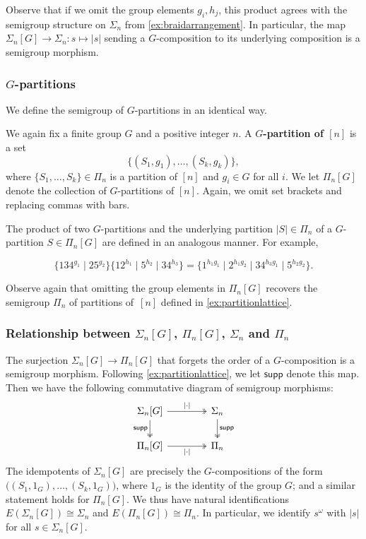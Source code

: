 \documentclass[11pt, oneside, reqno]{amsart}
\theoremstyle{definition}
\numberwithin{equation}{section}
\newcommand{\defn}[1]{{\color{RoyalBlue}\bf#1}}
\def \gsetcomposition{{\Sigma_n[G]}}
\def \gsetpartition{{\Pi_n[G]}}
\def \hsiao {{\gsetcomposition}}
\def \supp{\mathsf{supp}}
\newcommand{\abs}[1]{|{#1}|} 				%
\begin{document}
Observe that if we omit the group elements $g_i,h_j$, this product agrees with the semigroup structure on $\Sigma_n$ from \cref{ex:braidarrangement}.
In particular, the map $\hsiao \to \Sigma_n : s \mapsto \abs{s}$ sending a $G$-composition to its underlying composition is a semigroup morphism.

\subsubsection{$G$-partitions}
We define the semigroup of $G$-partitions in an identical way.

    We again fix a finite group $G$ and a positive integer $n$.
    A \defn{$G$-partition of $[n]$} is a set 
    \begin{equation*}
        \{ (S_1,g_1),\dots,(S_k,g_k) \},
    \end{equation*}
    where $\{ S_1,\dots,S_k \} \in \Pi_n$ is a partition of $[n]$ and $g_i \in G$ for all $i$.
    We let $\gsetpartition$ denote the collection of $G$-partitions of $[n]$. Again, we omit set brackets and replacing commas with bars.

    
    The product of two $G$-partitions and the underlying partition $\abs{S} \in \Pi_n$ of a $G$-partition $S \in \gsetpartition$ are defined in an analogous manner.
    For example,

    \[
        \big \{  134^{g_1} \mid 25^{g_2} \big\}  \big \{  12^{h_1} \mid 5^{h_2} \mid 34^{h_3}  \big \} = \big\{ 1^{h_1 g_1} \mid 2^{h_1 g_2} \mid 34^{h_3 g_1} \mid 5^{h_2 g_2}   \big \} .
    \]


Observe again that omitting the group elements in $\gsetpartition$ recovers the semigroup $\Pi_n$ of partitions of~$[n]$
defined in \cref{ex:partitionlattice}.

\subsubsection{Relationship between $\hsiao$, $\gsetpartition$, $\Sigma_n$ and $\Pi_n$}

The surjection $\hsiao \to \gsetpartition$ that forgets the order of a $G$-composition is a semigroup morphism.
Following \cref{ex:partitionlattice}, we let $\supp$ denote this map.
Then we have the following commutative diagram of semigroup morphisms:
\begin{equation}\label{eq:hsiao-quotients}
    \begin{tikzcd}[column sep=4em]
            \hsiao \arrow[d, "\supp"', two heads] \arrow[r, "\abs{\cdot}", two heads] & \Sigma_n \arrow[d, "\supp", two heads] \\
            \gsetpartition \arrow[r, "\abs{\cdot}"', two heads]                        & \Pi_n
    \end{tikzcd}
\end{equation}
The idempotents of $\hsiao$ are precisely the $G$-compositions of the form $\big( (S_1,1_G),\dots,(S_k,1_G) \big)$, where $1_G$ is the identity of the group $G$;
and a similar statement holds for $\gsetpartition$.
We thus have natural identifications $E(\hsiao) \cong \Sigma_n$ and $E(\gsetpartition) \cong \Pi_n$.
In particular, we identify $s^\omega$ with $\abs{s}$ for all $s \in \hsiao$.
\end{document}
